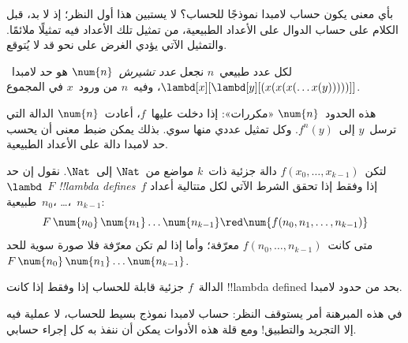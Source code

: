 \documentclass[../../../include/open-logic-section]{subfiles}
\begin{document}

بأي معنى يكون حساب لامبدا نموذجًا للحساب؟
لا يستبين هذا أول النظر؛ إذ لا بد، قبل الكلام على حساب
الدوال على الأعداد الطبيعية، من تمثيل تلك الأعداد فيه تمثيلًا
ملائمًا. والتمثيل الآتي يؤدي الغرض على نحو قد لا يُتوقع.

\begin{defn}
لكل عدد طبيعي~$n$ نجعل \emph{عدد تشيرش}~$\num{n}$
هو حد لامبدا~$\lambd[x][\lambd[y][(x(x(x(\dots x(y)))))]]$،
وفيه~$n$ من ورود~$x$ في المجموع.
\end{defn}

هذه الحدود~$\num{n}$ «مكررات»: إذا دخلت عليها~$f$،
أعادت~$\num{n}$ الدالة التي ترسل~$y$ إلى~$f^n(y)$.
وكل تمثيل عددي منها سوي. بذلك يمكن ضبط معنى أن يحسب
حد لامبدا دالة على الأعداد الطبيعية.

\begin{defn}
لتكن~$f(x_0, \dots, x_{k-1})$ دالة جزئية ذات~$k$ مواضع
من~$\Nat$ إلى~$\Nat$. نقول إن حد~$\lambd$~$F$
\emph{!!{lambda define}s}~$f$ إذا وفقط إذا تحقق الشرط الآتي
لكل متتالية أعداد طبيعية~$n_0$، \dots،~$n_{k-1}$:
\[
F\, \num{n_0}\, \num{n_1} \dots \num{n_{k-1}} \red \num{f(n_0, n_1, \dots,
  n_{k-1})}
\]
متى كانت~$f(n_0, \dots, n_{k-1})$ معرّفة؛ وأما إذا لم تكن
معرّفة فلا صورة سوية للحد
$F\, \num{n_0}\, \num{n_1} \dots \num{n_{k-1}}$.
\end{defn}

\begin{thm}
الدالة~$f$ جزئية قابلة للحساب إذا وفقط إذا كانت
!!{lambda defined} بحد من حدود لامبدا.
\end{thm}

\begin{explain}
في هذه المبرهنة أمر يستوقف النظر: حساب لامبدا نموذج بسيط
للحساب، لا عملية فيه إلا التجريد والتطبيق!{}
ومع قلة هذه الأدوات يمكن أن ننفذ به كل إجراء حسابي.
\end{explain}
\end{document}
